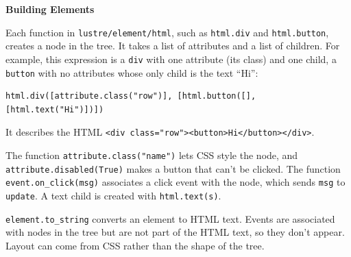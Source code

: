 \begin{blocksection}
\vspace{\baselineskip}
\textbf{Building Elements}

Each function in \lstinline$lustre/element/html$, such as \lstinline$html.div$ and \lstinline$html.button$, creates a node in the tree. It takes a list of attributes and a list of children. For example, this expression is a \lstinline$div$ with one attribute (its class) and one child, a \lstinline$button$ with no attributes whose only child is the text ``Hi'':

\begin{lstlisting}
html.div([attribute.class("row")], [html.button([], [html.text("Hi")])])
\end{lstlisting}

It describes the HTML \lstinline$<div class="row"><button>Hi</button></div>$.

The function \lstinline$attribute.class("name")$ lets CSS style the node, and \lstinline$attribute.disabled(True)$ makes a button that can't be clicked. The function \lstinline$event.on_click(msg)$ associates a click event with the node, which sends \lstinline$msg$ to \lstinline$update$. A text child is created with \lstinline$html.text(s)$.

\lstinline$element.to_string$ converts an element to HTML text. Events are associated with nodes in the tree but are not part of the HTML text, so they don't appear. Layout can come from CSS rather than the shape of the tree.
\end{blocksection}